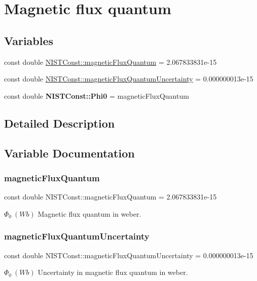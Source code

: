 \hypertarget{group___magnetic_flux_quantum}{}\section{Magnetic flux quantum}
\label{group___magnetic_flux_quantum}
\subsection*{Variables}
\begin{DoxyCompactItemize}
\item 
const double \hyperlink{group___magnetic_flux_quantum_ga2ed9e5fb19a6f2cc0c25ad945ea6b562}{N\+I\+S\+T\+Const\+::magnetic\+Flux\+Quantum} = 2.\+067833831e-\/15
\item 
const double \hyperlink{group___magnetic_flux_quantum_gabb501bffb2a565762d9f4bde15f859b6}{N\+I\+S\+T\+Const\+::magnetic\+Flux\+Quantum\+Uncertainty} = 0.\+000000013e-\/15
\item 
\mbox{\label{group___magnetic_flux_quantum_ga17c4e5dc1a9ccc86990f9236ffbc42a3}} 
const double {\bfseries N\+I\+S\+T\+Const\+::\+Phi0} = magnetic\+Flux\+Quantum
\end{DoxyCompactItemize}


\subsection{Detailed Description}


\subsection{Variable Documentation}
\mbox{\label{group___magnetic_flux_quantum_ga2ed9e5fb19a6f2cc0c25ad945ea6b562}} 
\subsubsection{\texorpdfstring{magnetic\+Flux\+Quantum}{magneticFluxQuantum}}
{\footnotesize\ttfamily const double N\+I\+S\+T\+Const\+::magnetic\+Flux\+Quantum = 2.\+067833831e-\/15}

$\Phi_0 \ (Wb)$ Magnetic flux quantum in weber. \mbox{\label{group___magnetic_flux_quantum_gabb501bffb2a565762d9f4bde15f859b6}} 
\subsubsection{\texorpdfstring{magnetic\+Flux\+Quantum\+Uncertainty}{magneticFluxQuantumUncertainty}}
{\footnotesize\ttfamily const double N\+I\+S\+T\+Const\+::magnetic\+Flux\+Quantum\+Uncertainty = 0.\+000000013e-\/15}

$\Phi_0 \ (Wb)$ Uncertainty in magnetic flux quantum in weber. 